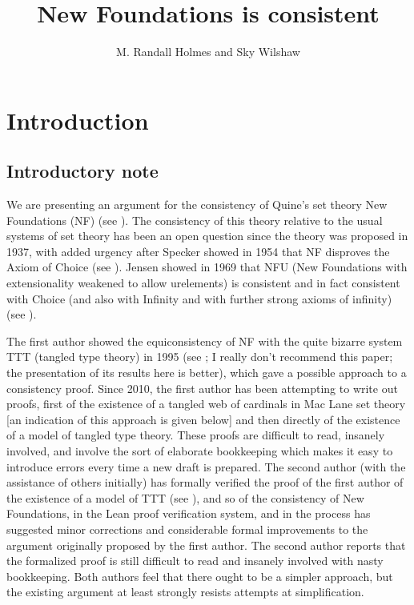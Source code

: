 \documentclass[112pt]{article}
\title{New Foundations is consistent}
\author{M. Randall Holmes and Sky Wilshaw}
\begin{document}
\maketitle

\tableofcontents

\newpage


\newpage

\section{Introduction}

\subsection{Introductory note}

We are presenting an argument for the consistency of Quine's set theory New Foundations (NF) (see \cite{nf}).  The consistency of this theory relative to the usual systems of set theory has been an open question since the theory was proposed in 1937, with added urgency after Specker showed in 1954 that NF disproves the Axiom of Choice (see \cite{notac}).
Jensen showed in 1969 that NFU (New Foundations with extensionality weakened to allow urelements) is consistent and in fact consistent with Choice (and also with Infinity and with further strong axioms of infinity) (see \cite{nfu}).  

The first author showed the equiconsistency of NF with the quite bizarre system TTT (tangled type theory) in 1995 (see \cite{tangled};  I really don't recommend this paper; the presentation of its results here is better), which gave a possible approach to a consistency proof.  Since 2010, the first author has been attempting to write out proofs, first of the existence of a tangled web of cardinals in Mac Lane set theory [an indication of this approach is given below] and then directly of the existence of a model of tangled type theory.  These proofs are difficult to read, insanely involved, and involve the sort of elaborate bookkeeping which makes it easy to introduce errors every time a new draft is prepared.  The second author (with the assistance of others initially)
has formally verified the proof of the first author of the existence of a model of TTT (see \cite{wilshaw}), and so of the consistency of New Foundations, in the Lean proof verification system, and in the process has suggested minor corrections and considerable formal improvements to the argument originally proposed by the first author.  The second author reports that the formalized proof is still difficult to read and insanely involved with nasty bookkeeping.  Both authors feel that there ought to be a simpler approach, but the existing argument at least strongly resists attempts at simplification.
\end{document}
